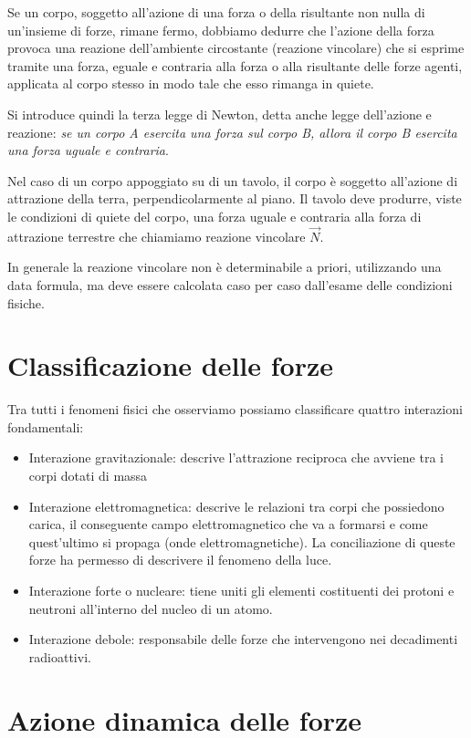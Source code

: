 \documentclass[class=book, crop=false, oneside, 12pt]{standalone}
\begin{document}
Se un corpo, soggetto all'azione di una forza o della risultante non nulla di un'insieme di forze, rimane fermo, dobbiamo dedurre che l'azione della forza provoca una reazione dell'ambiente circostante (reazione vincolare) che si esprime tramite una forza, eguale e contraria alla forza o alla risultante delle forze agenti,
applicata al corpo stesso in modo tale che esso rimanga in quiete.

Si introduce quindi la terza legge di Newton, detta anche legge dell'azione e reazione:
\emph{se un corpo A esercita una forza sul corpo B, allora il corpo B esercita una forza uguale e contraria}.

Nel caso di un corpo appoggiato su di un tavolo, il corpo è soggetto all'azione di attrazione della terra, perpendicolarmente al piano.
Il tavolo deve produrre, viste le condizioni di quiete del corpo, una forza uguale e contraria alla forza di attrazione terrestre che chiamiamo reazione vincolare \(\overrightarrow{N}\).

In generale la reazione vincolare non è determinabile a priori, utilizzando una data formula, ma deve essere calcolata caso per caso dall'esame delle condizioni fisiche.

\section{Classificazione delle forze}

Tra tutti i fenomeni fisici che osserviamo possiamo classificare quattro interazioni fondamentali:
\begin{itemize}
    \item Interazione gravitazionale: descrive l'attrazione reciproca che avviene tra i corpi dotati di massa
    \item Interazione elettromagnetica: descrive le relazioni tra corpi che possiedono carica, il conseguente campo elettromagnetico che va a formarsi e come quest'ultimo si propaga (onde elettromagnetiche). La conciliazione di queste forze ha permesso di descrivere il fenomeno della luce.
    \item Interazione forte o nucleare: tiene uniti gli elementi costituenti dei protoni e neutroni all'interno del nucleo di un atomo.
    \item Interazione debole: responsabile delle forze che intervengono nei decadimenti radioattivi.
\end{itemize}

\section{Azione dinamica delle forze}
\end{document}
